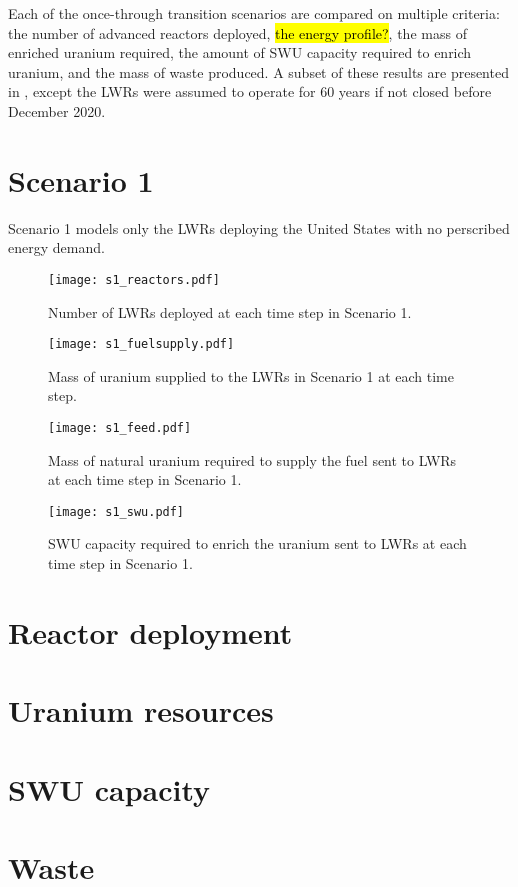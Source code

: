 
Each of the once-through transition scenarios are compared on multiple 
criteria: the number of advanced reactors deployed, \hl{the energy profile?}, 
the mass of enriched 
uranium required, the amount of \gls{SWU} capacity required to enrich uranium,
and the mass of waste produced. A subset of these results are presented
in \cite{bachmann_enrichment_2021}, except the \glspl{LWR} were assumed to 
operate for 60 years if not closed before December 2020. 

\section{Scenario 1}
Scenario 1 models only the \glspl{LWR} deploying the United States with no 
perscribed energy demand. 

\begin{figure}
    \centering
    \texttt{[image: s1\_reactors.pdf]}
    \caption{Number of LWRs deployed at each time step in Scenario 1.}
    \label{fig:reactor1}
\end{figure}

\begin{figure}
    \centering
    \texttt{[image: s1\_fuelsupply.pdf]}
    \caption{Mass of uranium supplied to the LWRs in Scenario 1 at each time step.}
    \label{fig:fuel1}
\end{figure}

\begin{figure}
    \centering
    \texttt{[image: s1\_feed.pdf]}
    \caption{Mass of natural uranium required to supply the fuel sent to LWRs at each time step in Scenario 1.}
    \label{fig:feed1}
\end{figure}

\begin{figure}
    \centering
    \texttt{[image: s1\_swu.pdf]}
    \caption{SWU capacity required to enrich the uranium sent to LWRs at each time step in Scenario 1.}
    \label{fig:swu1}
\end{figure}

\section{Reactor deployment}

\section{Uranium resources}

\section{SWU capacity}

\section{Waste}